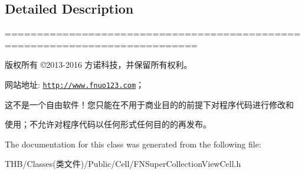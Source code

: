 \subsection{Detailed Description}
============================================================================

版权所有 ©2013-\/2016 方诺科技，并保留所有权利。

网站地址\+: \href{http://www.fnuo123.com}{\tt http\+://www.\+fnuo123.\+com}； 



这不是一个自由软件！您只能在不用于商业目的的前提下对程序代码进行修改和

使用；不允许对程序代码以任何形式任何目的的再发布。 

 

The documentation for this class was generated from the following file\+:\begin{DoxyCompactItemize}
\item 
T\+H\+B/\+Classes(类文件)/\+Public/\+Cell/F\+N\+Super\+Collection\+View\+Cell.\+h\end{DoxyCompactItemize}
